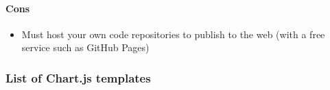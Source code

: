 \documentclass[
  english,
]{book}
\providecommand{\tightlist}{%
  \setlength{\itemsep}{0pt}\setlength{\parskip}{0pt}}
\begin{document}
\hypertarget{cons}{%
\paragraph{Cons}\label{cons}}

\begin{itemize}
\tightlist
\item
  Must host your own code repositories to publish to the web (with a free service such as GitHub Pages)
\end{itemize}

\hypertarget{list-of-chart.js-templates}{%
\subsubsection{List of Chart.js templates}\label{list-of-chart.js-templates}}
\end{document}

